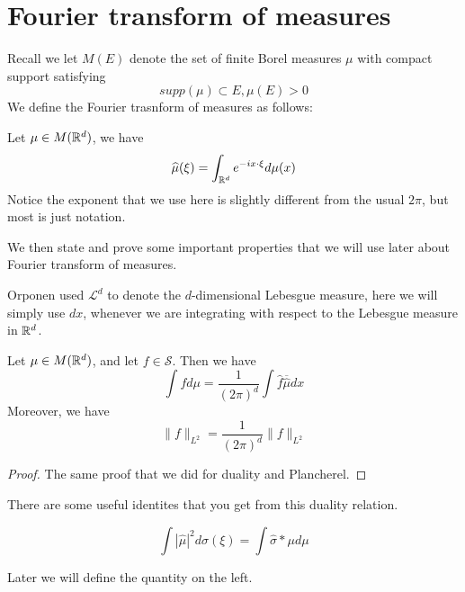 \chapter{Fourier transform of measures}
Recall we let $M(E)$ denote the set of finite Borel measures $\mu$ with compact support satisfying 
\begin{equation*}
    supp(\mu)\subset E, \mu(E)>0
\end{equation*}
We define the Fourier trasnform of measures as follows:
\begin{definition}
    Let $\mu\in M(\mathbb{R}^d)$, we have 
    \begin{equation*}
        \widehat{\mu}(\xi)=\int_{\mathbb{R}^d}e^{-ix\cdot\xi}d\mu(x)
    \end{equation*}
    Notice the exponent that we use here is slightly different from the usual $2\pi$, but most is just notation.
\end{definition}
We then state and prove some important properties that we will use later about Fourier transform of measures.
\begin{note}
    Orponen used $\mathcal{L}^d$ to denote the $d$-dimensional Lebesgue measure, here we will simply use $dx$, whenever we are integrating with respect to the Lebesgue measure in $\mathbb{R}^d$.
\end{note}
\begin{proposition}
    Let $\mu\in M(\mathbb{R}^d)$, and let $f\in\mathcal{S}$. Then we have 
    \begin{equation*}
        \int fd\mu=\frac{1}{(2\pi)^d}\int\hat{f}\overline{\hat{\mu}}dx
    \end{equation*}
    Moreover, we have 
    \begin{equation*}
        \|f\|_{L^2}=\frac{1}{(2\pi)^d}\|f\|_{L^2}
    \end{equation*}
\end{proposition}
\begin{proof}
    The same proof that we did for duality and Plancherel.
\end{proof}
There are some useful identites that you get from this duality relation.
\begin{corollary}
    \begin{equation*}
        \int|\hat{\mu}|^2d\sigma(\xi)=\int \hat{\sigma}\ast \mu d\mu
    \end{equation*}
\end{corollary}
Later we will define the quantity on the left.


